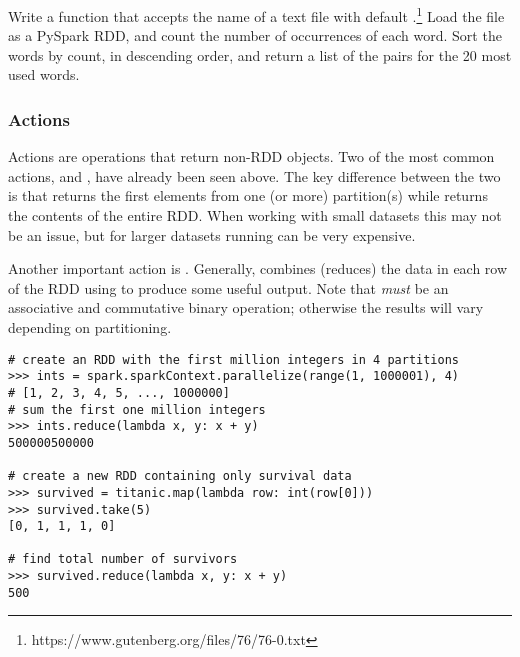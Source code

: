 \begin{problem}
Write a function that accepts the name of a text file with default .\footnote{https://www.gutenberg.org/files/76/76-0.txt}
Load the file as a PySpark RDD, and count the number of occurrences of each word.
Sort the words by count, in descending order, and return a list of the  pairs for the 20 most used words.
\label{prob:spark-rdd-hello-world}
\end{problem}

\subsubsection*{Actions}
Actions are operations that return non-RDD objects.
Two of the most common actions,  and , have already been seen above.
The key difference between the two is that  returns the first  elements from one (or more) partition(s) while  returns the contents of the entire RDD.
When working with small datasets this may not be an issue, but for larger datasets running  can be very expensive.

Another important action is . Generally,  combines (reduces) the data in each row of the RDD using  to produce some useful output. 
Note that  \textit{must} be an associative and commutative binary operation; otherwise the results will vary depending on partitioning.

\begin{lstlisting}
# create an RDD with the first million integers in 4 partitions
>>> ints = spark.sparkContext.parallelize(range(1, 1000001), 4)
# [1, 2, 3, 4, 5, ..., 1000000]
# sum the first one million integers
>>> ints.reduce(lambda x, y: x + y)
500000500000

# create a new RDD containing only survival data
>>> survived = titanic.map(lambda row: int(row[0]))
>>> survived.take(5)
[0, 1, 1, 1, 0]

# find total number of survivors
>>> survived.reduce(lambda x, y: x + y)
500
\end{lstlisting}

